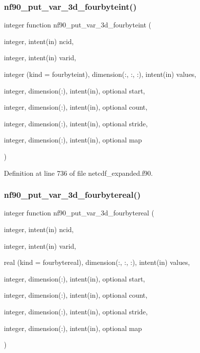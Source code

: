 \subsubsection{\texorpdfstring{nf90\+\_\+put\+\_\+var\+\_\+3d\+\_\+fourbyteint()}{nf90\_put\_var\_3d\_fourbyteint()}}
{\footnotesize\ttfamily integer function nf90\+\_\+put\+\_\+var\+\_\+3d\+\_\+fourbyteint (\begin{DoxyParamCaption}\item[{integer, intent(in)}]{ncid,  }\item[{integer, intent(in)}]{varid,  }\item[{integer (kind = fourbyteint), dimension(\+:, \+:, \+:), intent(in)}]{values,  }\item[{integer, dimension(\+:), intent(in), optional}]{start,  }\item[{integer, dimension(\+:), intent(in), optional}]{count,  }\item[{integer, dimension(\+:), intent(in), optional}]{stride,  }\item[{integer, dimension(\+:), intent(in), optional}]{map }\end{DoxyParamCaption})}



Definition at line 736 of file netcdf\+\_\+expanded.\+f90.

\mbox{\label{netcdf__expanded_8f90_ac726487eae2262fda92708cd55ffab5b}} 
\subsubsection{\texorpdfstring{nf90\+\_\+put\+\_\+var\+\_\+3d\+\_\+fourbytereal()}{nf90\_put\_var\_3d\_fourbytereal()}}
{\footnotesize\ttfamily integer function nf90\+\_\+put\+\_\+var\+\_\+3d\+\_\+fourbytereal (\begin{DoxyParamCaption}\item[{integer, intent(in)}]{ncid,  }\item[{integer, intent(in)}]{varid,  }\item[{real (kind = fourbytereal), dimension(\+:, \+:, \+:), intent(in)}]{values,  }\item[{integer, dimension(\+:), intent(in), optional}]{start,  }\item[{integer, dimension(\+:), intent(in), optional}]{count,  }\item[{integer, dimension(\+:), intent(in), optional}]{stride,  }\item[{integer, dimension(\+:), intent(in), optional}]{map }\end{DoxyParamCaption})}



